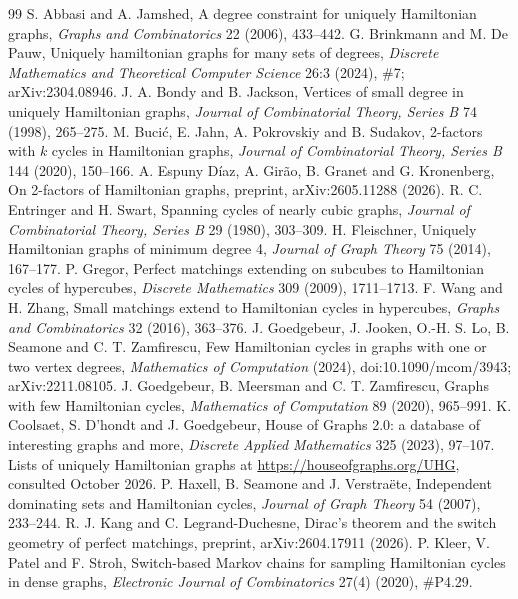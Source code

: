 \documentclass[11pt,a4paper]{article}
\theoremstyle{definition}
\theoremstyle{remark}
\begin{document}
\begin{thebibliography}{99}
 S. Abbasi and A. Jamshed, A degree constraint for uniquely Hamiltonian graphs, \emph{Graphs and Combinatorics} 22 (2006), 433--442.
 G. Brinkmann and M. De Pauw, Uniquely hamiltonian graphs for many sets of degrees, \emph{Discrete Mathematics and Theoretical Computer Science} 26:3 (2024), \#7; arXiv:2304.08946.
 J. A. Bondy and B. Jackson, Vertices of small degree in uniquely Hamiltonian graphs, \emph{Journal of Combinatorial Theory, Series B} 74 (1998), 265--275.
 M. Bucić, E. Jahn, A. Pokrovskiy and B. Sudakov, 2-factors with $k$ cycles in Hamiltonian graphs, \emph{Journal of Combinatorial Theory, Series B} 144 (2020), 150--166.
 A. Espuny Díaz, A. Girão, B. Granet and G. Kronenberg, On 2-factors of Hamiltonian graphs, preprint, arXiv:2605.11288 (2026).
 R. C. Entringer and H. Swart, Spanning cycles of nearly cubic graphs, \emph{Journal of Combinatorial Theory, Series B} 29 (1980), 303--309.
 H. Fleischner, Uniquely Hamiltonian graphs of minimum degree 4, \emph{Journal of Graph Theory} 75 (2014), 167--177.
 P. Gregor, Perfect matchings extending on subcubes to Hamiltonian cycles of hypercubes, \emph{Discrete Mathematics} 309 (2009), 1711--1713.
 F. Wang and H. Zhang, Small matchings extend to Hamiltonian cycles in hypercubes, \emph{Graphs and Combinatorics} 32 (2016), 363--376.
 J. Goedgebeur, J. Jooken, O.-H. S. Lo, B. Seamone and C. T. Zamfirescu, Few Hamiltonian cycles in graphs with one or two vertex degrees, \emph{Mathematics of Computation} (2024), doi:10.1090/mcom/3943; arXiv:2211.08105.
 J. Goedgebeur, B. Meersman and C. T. Zamfirescu, Graphs with few Hamiltonian cycles, \emph{Mathematics of Computation} 89 (2020), 965--991.
 K. Coolsaet, S. D'hondt and J. Goedgebeur, House of Graphs 2.0: a database of interesting graphs and more, \emph{Discrete Applied Mathematics} 325 (2023), 97--107. Lists of uniquely Hamiltonian graphs at \url{https://houseofgraphs.org/UHG}, consulted October 2026.
 P. Haxell, B. Seamone and J. Verstraëte, Independent dominating sets and Hamiltonian cycles, \emph{Journal of Graph Theory} 54 (2007), 233--244.
 R. J. Kang and C. Legrand-Duchesne, Dirac's theorem and the switch geometry of perfect matchings, preprint, arXiv:2604.17911 (2026).
 P. Kleer, V. Patel and F. Stroh, Switch-based Markov chains for sampling Hamiltonian cycles in dense graphs, \emph{Electronic Journal of Combinatorics} 27(4) (2020), \#P4.29.

\end{thebibliography}
\end{document}
